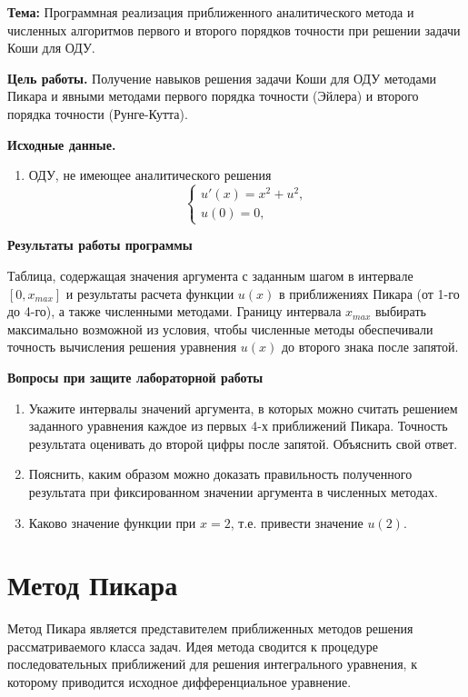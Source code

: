 \textbf{Тема:} Программная реализация приближенного аналитического метода и численных алгоритмов первого и второго порядков точности при решении задачи Коши для ОДУ.

\textbf{Цель работы.} Получение навыков решения задачи Коши для ОДУ методами Пикара и явными методами первого порядка точности (Эйлера) и второго порядка точности (Рунге-Кутта).

\textbf{Исходные данные.}
\begin{enumerate}
    \item ОДУ, не имеющее аналитического решения
    \begin{equation*}
        \begin{cases}
            u'(x) = x^2 + u^2, \\
            u(0) = 0,
        \end{cases}
    \end{equation*}
\end{enumerate}

\textbf{Результаты работы программы}

Таблица, содержащая значения аргумента с заданным шагом в интервале $[0, x_{max}]$ и
результаты расчета функции $u(x)$ в приближениях Пикара (от 1-го до 4-го), а также
численными методами. Границу интервала $x_{max}$ выбирать максимально возможной из условия, чтобы численные методы обеспечивали точность вычисления решения уравнения
$u(x)$ до второго знака после запятой.

\textbf{Вопросы при защите лабораторной работы}
\begin{enumerate}
    \item Укажите интервалы значений аргумента, в которых можно считать решением заданного уравнения каждое из первых 4-х приближений Пикара. Точность результата оценивать до второй цифры после запятой. Объяснить свой ответ.
    \item Пояснить, каким образом можно доказать правильность полученного результата при фиксированном значении аргумента в численных методах.
    \item Каково значение функции при $x=2$, т.е. привести значение $u(2)$.
\end{enumerate}

\section{Метод Пикара}
Метод Пикара является представителем приближенных методов решения рассматриваемого класса задач. Идея метода сводится к процедуре последовательных приближений для решения интегрального уравнения, к которому приводится исходное дифференциальное уравнение.

